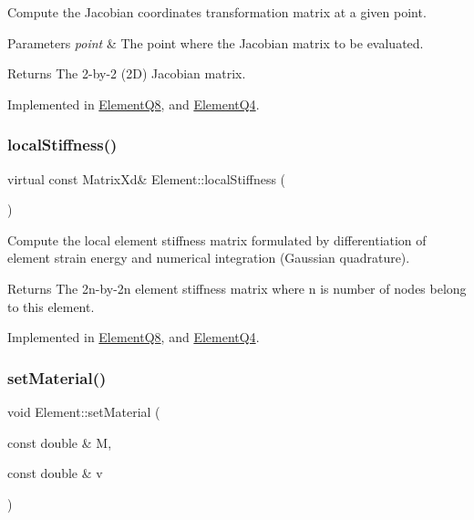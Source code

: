 Compute the Jacobian coordinates transformation matrix at a given point. 


\begin{DoxyParams}{Parameters}
{\em point} & The point where the Jacobian matrix to be evaluated. \\
\hline
\end{DoxyParams}
\begin{DoxyReturn}{Returns}
The 2-\/by-\/2 (2D) Jacobian matrix. 
\end{DoxyReturn}


Implemented in \mbox{\hyperlink{class_element_q8_ae23bf98a466daa224224da495d5724ff}{Element\+Q8}}, and \mbox{\hyperlink{class_element_q4_a1347c3ce4ef1c34a16aa72fdf593932d}{Element\+Q4}}.

\mbox{\label{class_element_a603fbe060b5d6979506f0d2130e6c171}} 
\subsubsection{\texorpdfstring{local\+Stiffness()}{localStiffness()}}
{\footnotesize\ttfamily virtual const Matrix\+Xd\& Element\+::local\+Stiffness (\begin{DoxyParamCaption}{ }\end{DoxyParamCaption})\hspace{0.3cm}{\ttfamily [pure virtual]}}



Compute the local element stiffness matrix formulated by differentiation of element strain energy and numerical integration (Gaussian quadrature). 

\begin{DoxyReturn}{Returns}
The 2n-\/by-\/2n element stiffness matrix where n is number of nodes belong to this element. 
\end{DoxyReturn}


Implemented in \mbox{\hyperlink{class_element_q8_afc898e404f9abb5a5a4d74eee54476b7}{Element\+Q8}}, and \mbox{\hyperlink{class_element_q4_a9a127fdfd6f80efe3c35f20d7b1296cf}{Element\+Q4}}.

\mbox{\label{class_element_ad74b47354fe0608c9baba38c79e5b549}} 
\subsubsection{\texorpdfstring{set\+Material()}{setMaterial()}}
{\footnotesize\ttfamily void Element\+::set\+Material (\begin{DoxyParamCaption}\item[{const double \&}]{M,  }\item[{const double \&}]{v }\end{DoxyParamCaption})}



